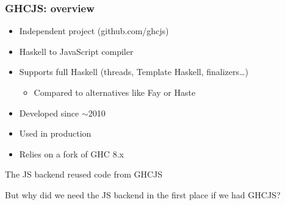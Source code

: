 \documentclass[aspectratio=169]{beamer}
\begin{document}
\begin{frame}
\frametitle{GHCJS: overview}
\begin{itemize}
\item Independent project (github.com/ghcjs)
\item Haskell to JavaScript compiler
\item Supports full Haskell (threads, Template Haskell, finalizers…)
\begin{itemize}
\item Compared to alternatives like Fay or Haste
\end{itemize}
\item Developed since $\sim$2010
\item Used in production
\item Relies on a fork of GHC 8.x
\end{itemize}
\begin{center}
\alert{The JS backend reused code from GHCJS}
\end{center}
But why did we need the JS backend in the first place if we had GHCJS?
\end{frame}
\end{document}
